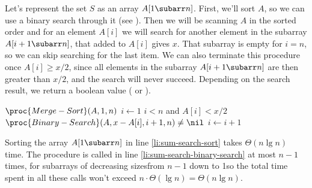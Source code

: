 Let's represent the set $S$ as an array $A[1\subarr n]$.
First, we'll sort $A$, so we can use a binary search through it (see ).
Then we will be scanning $A$ in the sorted order and for an element $A[i]$ we will search for another element in the subarray $A[i+1\subarr n]$, that added to $A[i]$ gives $x$.
That subarray is empty for $i=n$, so we can skip searching for the last item.
We can also terminate this procedure once $A[i]\ge x/2$, since all elements in the subarray $A[i+1\subarr n]$ are then greater than $x/2$, and the search will never succeed.
Depending on the search result, we return a boolean value ( or ).

\begin{codebox}
\li $\proc{Merge-Sort}(A,1,n)$ \label{li:sum-search-sort}
\li $i\gets1$
\li \While $i<n$ and $A[i]<x/2$
\li     \Do \If $\proc{Binary-Search}(A,x-A[i],i+1,n)\ne\nil$ \label{li:sum-search-binary-search}
\li             \Then \Return {}
                \End
\li         $i\gets i+1$
        \End
\li \Return {}
\end{codebox}

Sorting the array $A[1\subarr n]$ in line \ref{li:sum-search-sort} takes $\Theta(n\lg n)$ time.
The procedure  is called in line \ref{li:sum-search-binary-search} at most $n-1$ times, for subarrays of decreasing sizes\dash from $n-1$ down to 1\dash so the total time spent in all these calls won't exceed $n\cdot\Theta(\lg n)=\Theta(n\lg n)$.
